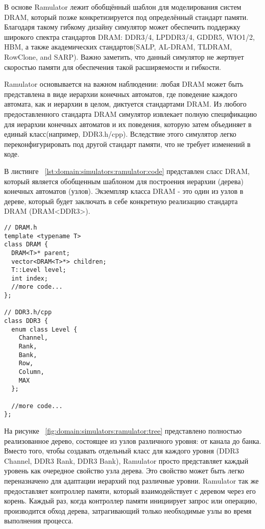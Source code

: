 В основе Ramulator лежит обобщённый шаблон для моделирования систем DRAM, который позже конкретизируется под определённый стандарт памяти. Благодаря такому гибкому дизайну симулятор может обеспечить поддержку широкого спектра стандартов DRAM: DDR3/4, LPDDR3/4, GDDR5, WIO1/2, HBM, а также академических стандартов(SALP, AL-DRAM, TLDRAM, RowClone, and SARP).  Важно заметить, что данный симулятор не жертвует скоростью памяти для обеспечения такой расширяемости и гибкости. 

Ramulator основывается на важном наблюдении: любая DRAM может быть представлена в виде иерархии конечных автоматов, где поведение каждого автомата, как и иерархии в целом, диктуется стандартами DRAM.
Из любого предоставленного стандарта DRAM симулятор извлекает полную спецификацию для иерархии конечных автоматов и их поведения, которую затем объединяет в единый класс(например, DDR3.h/cpp). Вследствие этого симулятор легко переконфигурировать под другой стандарт памяти, что не требует изменений в коде.

В листинге ~\ref{lst:domain:simulators:ramulator:code} представлен сласс DRAM, который является обобщенным шаблоном для построения иерархии (дерева) конечных автоматов (узлов). Экземпляр класса DRAM  - это один из узлов в дереве, который будет заключать в себе конкретную реализацию стандарта DRAM (DRAM<DDR3>).

\begin{lstlisting}[style=cplusplusstyle, caption={Метод записи конкретных бит в слове}, label=lst:domain:simulators:ramulator:code]
// DRAM.h
template <typename T>
class DRAM {
  DRAM<T>* parent;
  vector<DRAM<T>*> children;
  T::Level level;
  int index;
  //more code...
};

// DDR3.h/cpp
class DDR3 {
  enum class Level {
    Channel,
    Rank,
    Bank,
    Row,
    Column,
    MAX
  };

  //more code...
};
\end{lstlisting}

На рисунке ~\ref{fig:domain:simulators:ramulator:tree} представлено полностью реализованное дерево, состоящее из узлов различного уровня: от канала до банка. Вместо того, чтобы создавать отдельный класс для каждого уровня (DDR3 Channel, DDR3 Rank, DDR3 Bank), Ramulator просто представляет каждый уровень как очередное свойство узла дерева. Это свойство может быть легко переназначено для адаптации иерархий под различные уровни. Ramulator так же предоставляет контроллер памяти, который взаимодействует с деревом через его корень. Каждый раз, когда контроллер памяти инициирует запрос или операцию, производится обход дерева, затрагивающий только необходимые узлы во время выполнения процесса.

